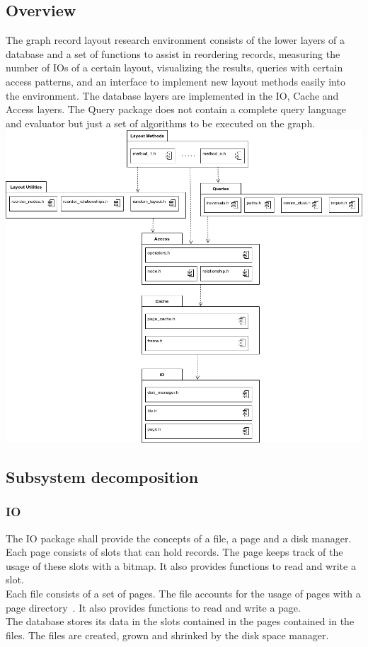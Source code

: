\subsection{Overview}
The graph record layout research environment consists of the lower layers of a database and a set of functions to assist in reordering records, measuring the number of IOs of a certain layout, visualizing the results, queries with certain access patterns, and an interface to implement new layout methods easily into the environment. The database layers are implemented in the IO, Cache and Access layers. The Query package does not contain a complete query language and evaluator but just a set of algorithms to be executed on the graph. \\ [2em]

\hspace{-2cm}\includegraphics[keepaspectratio,width=1.2\textwidth, height=.7\textheight]{img/overview.png}

\newpage

\subsection{Subsystem decomposition}
    \subsubsection{IO}
        The IO package shall provide the concepts of a file, a page and a disk manager. \\
        Each page consists of slots that can hold records. The page keeps track of the usage of these slots with a bitmap. It also provides functions to read and write a slot. \\
        Each file consists of a set of pages. The file accounts for the usage of pages with a page directory~\autocite{ramakrishnan2000database}. It also provides functions to read and write a page. \\
        The database stores its data in the slots contained in the pages contained in the files. The files are created, grown and shrinked by the disk space manager.  \\
        
